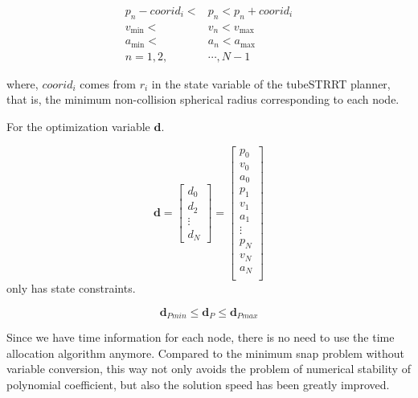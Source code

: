 \documentclass[times,authoryear]{elsarticle}
\begin{document}
\begin{equation}
	\begin{align}
		p_{n}-coorid_{i}<&p_n<p_{n}+coorid_{i}  \\
		v_{\min}<&v_n<v_{\max}  \\ 
		a_{\min}<&a_n<a_{\max}  \\ 
		n = 1,2,&\cdots,N-1
	\end{align}
\end{equation}

where, $coorid_{i}$ comes from $r_{i}$ in the state variable of the tubeSTRRT planner, that is, the minimum non-collision spherical radius corresponding to each node. 

For the optimization variable $\boldsymbol{d}$.

\begin{equation}
	\boldsymbol{d} = \begin{bmatrix}
		d_{0}  \\
		d_{2} \\
		\vdots \\
		d_{N}
		\end{bmatrix}
		 = 
		 \begin{bmatrix}
		p_{0} \\
		v_{0} \\
		a_{0} \\
		p_{1} \\
		v_{1} \\
		a_{1}  \\
		\vdots \\ 
		p_{N} \\
		v_{N} \\
		a_{N}  \\
	\end{bmatrix}
\end{equation}
only has state constraints.

\begin{equation}
	\boldsymbol{d}_{Pmin} \leq \boldsymbol{d}_{P}  \leq \boldsymbol{d}_{Pmax}
\end{equation}

Since we have time information for each node, there is no need to use the time allocation algorithm anymore.
Compared to the minimum snap problem without variable conversion, this way not only avoids the problem of numerical stability of polynomial coefficient, but also the solution speed has been greatly improved.


\end{document}
